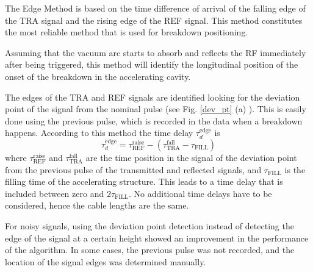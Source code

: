 The Edge Method is based on the time difference of arrival of the falling edge of the TRA signal and the rising edge of the REF signal. This method constitutes the most reliable method that is used for breakdown positioning. 

Assuming that the vacuum arc starts to absorb and reflects the RF immediately after being triggered, this method will identify the longitudinal position of the onset of the breakdown in the accelerating cavity.

The edges of the TRA and REF signals are identified looking for the deviation point of the signal from the nominal pulse (see Fig. \ref{dev_pt} (a) ). This is easily done using the previous pulse, which is recorded in the data when a breakdown happens.  According to this method the time delay $\tau_d^{\text{edge}}$ is
\begin{equation}
\tau_d^{\text{edge}} = \tau_\text{REF} ^\text{raise} - (\tau_\text{TRA} ^\text{fall} - \tau_{\text{FILL}})
\end{equation}
where $\tau^\text{raise} _{\text{REF}} $ and $\tau^\text{fall} _{\text{TRA}}$ are the time position in the signal of the deviation point from the previous pulse of the transmitted and reflected signals, and $\tau_{\text{FILL}}$ is the filling time of the accelerating structure. This leads to a time delay that is included between zero and $2 \tau_{\text{FILL}}$. No additional time delays have to be considered, hence the cable lengths are the same. 

For noisy signals, using the deviation point detection instead of detecting the edge of the signal at a certain height showed an improvement in the performance of the algorithm. In some cases, the previous pulse was not recorded, and the location of the signal edges was determined manually.

